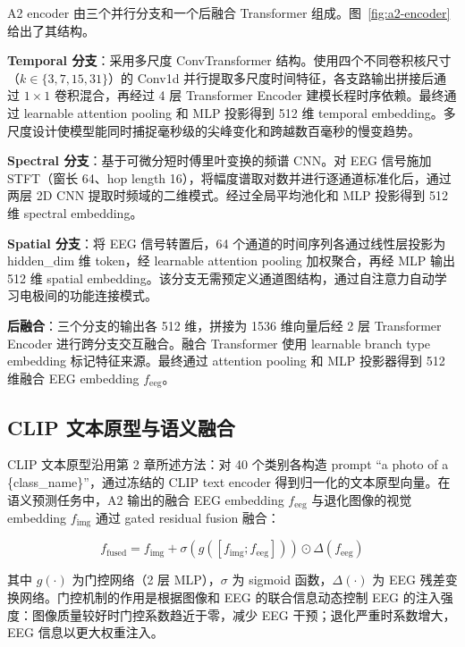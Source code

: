 A2 encoder 由三个并行分支和一个后融合 Transformer 组成。图~\ref{fig:a2-encoder} 给出了其结构。


\textbf{Temporal 分支}：采用多尺度 ConvTransformer 结构。使用四个不同卷积核尺寸（$k \in \{3, 7, 15, 31\}$）的 Conv1d 并行提取多尺度时间特征，各支路输出拼接后通过 $1\times1$ 卷积混合，再经过 4 层 Transformer Encoder 建模长程时序依赖。最终通过 learnable attention pooling 和 MLP 投影得到 512 维 temporal embedding。多尺度设计使模型能同时捕捉毫秒级的尖峰变化和跨越数百毫秒的慢变趋势。

\textbf{Spectral 分支}：基于可微分短时傅里叶变换的频谱 CNN。对 EEG 信号施加 STFT（窗长 64、hop length 16），将幅度谱取对数并进行逐通道标准化后，通过两层 2D CNN 提取时频域的二维模式。经过全局平均池化和 MLP 投影得到 512 维 spectral embedding。

\textbf{Spatial 分支}：将 EEG 信号转置后，64 个通道的时间序列各通过线性层投影为 hidden\_dim 维 token，经 learnable attention pooling 加权聚合，再经 MLP 输出 512 维 spatial embedding。该分支无需预定义通道图结构，通过自注意力自动学习电极间的功能连接模式。

\textbf{后融合}：三个分支的输出各 512 维，拼接为 1536 维向量后经 2 层 Transformer Encoder 进行跨分支交互融合。融合 Transformer 使用 learnable branch type embedding 标记特征来源。最终通过 attention pooling 和 MLP 投影器得到 512 维融合 EEG embedding $f_{\mathrm{eeg}}$。

\subsection{CLIP 文本原型与语义融合}

CLIP 文本原型沿用第 2 章所述方法：对 40 个类别各构造 prompt ``a photo of a \{class\_name\}''，通过冻结的 CLIP text encoder 得到归一化的文本原型向量。在语义预测任务中，A2 输出的融合 EEG embedding $f_{\mathrm{eeg}}$ 与退化图像的视觉 embedding $f_{\mathrm{img}}$ 通过 gated residual fusion 融合：

\begin{equation}
  f_{\mathrm{fused}} = f_{\mathrm{img}} + \sigma\left(g\left([f_{\mathrm{img}}; f_{\mathrm{eeg}}]\right)\right) \odot \Delta(f_{\mathrm{eeg}})
\end{equation}

其中 $g(\cdot)$ 为门控网络（2 层 MLP），$\sigma$ 为 sigmoid 函数，$\Delta(\cdot)$ 为 EEG 残差变换网络。门控机制的作用是根据图像和 EEG 的联合信息动态控制 EEG 的注入强度：图像质量较好时门控系数趋近于零，减少 EEG 干预；退化严重时系数增大，EEG 信息以更大权重注入。

